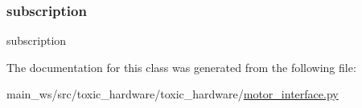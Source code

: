 \subsubsection{\texorpdfstring{subscription}{subscription}}
{\footnotesize\ttfamily subscription}



The documentation for this class was generated from the following file\+:\begin{DoxyCompactItemize}
\item 
main\+\_\+ws/src/toxic\+\_\+hardware/toxic\+\_\+hardware/\mbox{\hyperlink{motor__interface_8py}{motor\+\_\+interface.\+py}}\end{DoxyCompactItemize}
